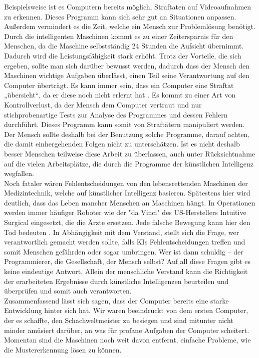 Beispielsweise ist es Computern bereits möglich, Straftaten auf Videoaufnahmen zu erkennen. Dieses Programm kann sich sehr gut an Situationen anpassen. Außerdem vermindert es die Zeit, welche ein Mensch zur Problemlösung benötigt. Durch die intelligenten Maschinen kommt es zu einer Zeitersparnis für den Menschen, da die Maschine selbstständig 24 Stunden die Aufsicht übernimmt. Dadurch wird die Leistungsfähigkeit stark erhöht. Trotz der Vorteile, die sich ergeben, sollte man sich darüber bewusst werden, dadurch dass der Mensch den Maschinen wichtige Aufgaben überlässt, einen Teil seine Verantwortung auf den Computer überträgt. Es kann immer sein, dass ein Computer eine Straftat „übersieht“, da er diese noch nicht erlernt hat \cite{UniversitaetHamburg_1}. Es kommt zu einer Art von Kontrollverlust, da der Mensch dem Computer vertraut und nur stichprobenartige Tests zur Analyse des Programmes und dessen Fehlern durchführt. Dieses Programm kann somit von Straftätern manipuliert werden. Der Mensch sollte deshalb bei der Benutzung solche Programme, darauf achten, die damit einhergehenden Folgen nicht zu unterschätzen. Ist es nicht deshalb besser Menschen teilweise diese Arbeit zu überlassen, auch unter Rücksichtnahme auf die vielen Arbeitsplätze, die durch die Programme der künstlichen Intelligenz wegfallen. \\
%

Noch fataler wären Fehlentscheidungen von den lebensrettenden Maschinen der Medizintechnik, welche auf künstlicher Intelligenz basieren. Spätestens hier wird deutlich, dass das Leben mancher Menschen an Maschinen hängt.  In Operationen werden immer häufiger Roboter wie der "da Vinci" des US-Herstellers Intuitive Surgical eingesetzt, die die Ärzte ersetzen. Jede falsche Bewegung kann hier den Tod bedeuten \cite{Spiegel_1}.
In Abhängigkeit mit dem Verstand, stellt sich die Frage, wer verantwortlich gemacht werden sollte, falls KIs Fehlentscheidungen treffen und somit Menschen gefährden oder sogar umbringen. Wer ist dann schuldig – der Programmierer, die Gesellschaft, der Mensch selbst? Auf all diese Fragen gibt es keine eindeutige Antwort. Allein der menschliche Verstand kann die Richtigkeit der erarbeiteten Ergebnisse durch künstliche Intelligenzen beurteilen und überprüfen und somit auch verantworten. \\
%

Zusammenfassend lässt sich sagen, dass der Computer bereits eine starke Entwicklung hinter sich hat. Wir waren beeindruckt von dem ersten Computer, der es schaffte, den Schachweltmeister zu besiegen und sind mitunter nicht minder amüsiert darüber, an was für profane Aufgaben der Computer scheitert. Momentan sind die Maschinen noch weit davon entfernt, einfache Probleme, wie die Mustererkennung lösen zu können.\\
%


